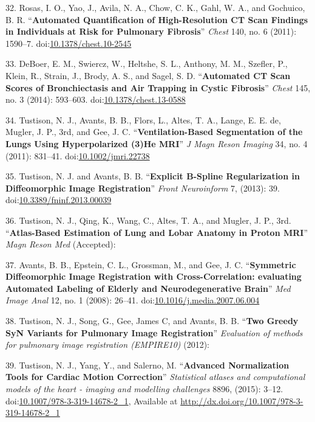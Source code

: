 \documentclass[11pt,]{article}
\begin{document}
32. Rosas, I. O., Yao, J., Avila, N. A., Chow, C. K., Gahl, W. A., and
Gochuico, B. R. ``\textbf{Automated Quantification of High-Resolution CT
Scan Findings in Individuals at Risk for Pulmonary Fibrosis}''
\emph{Chest} 140, no. 6 (2011): 1590--7.
doi:\href{http://dx.doi.org/10.1378/chest.10-2545}{10.1378/chest.10-2545}

33. DeBoer, E. M., Swiercz, W., Heltshe, S. L., Anthony, M. M., Szefler,
P., Klein, R., Strain, J., Brody, A. S., and Sagel, S. D.
``\textbf{Automated CT Scan Scores of Bronchiectasis and Air Trapping in
Cystic Fibrosis}'' \emph{Chest} 145, no. 3 (2014): 593--603.
doi:\href{http://dx.doi.org/10.1378/chest.13-0588}{10.1378/chest.13-0588}

34. Tustison, N. J., Avants, B. B., Flors, L., Altes, T. A., Lange, E.
E. de, Mugler, J. P., 3rd, and Gee, J. C. ``\textbf{Ventilation-Based
Segmentation of the Lungs Using Hyperpolarized (3)He MRI}'' \emph{J Magn
Reson Imaging} 34, no. 4 (2011): 831--41.
doi:\href{http://dx.doi.org/10.1002/jmri.22738}{10.1002/jmri.22738}

35. Tustison, N. J. and Avants, B. B. ``\textbf{Explicit B-Spline
Regularization in Diffeomorphic Image Registration}'' \emph{Front
Neuroinform} 7, (2013): 39.
doi:\href{http://dx.doi.org/10.3389/fninf.2013.00039}{10.3389/fninf.2013.00039}

36. Tustison, N. J., Qing, K., Wang, C., Altes, T. A., and Mugler, J.
P., 3rd. ``\textbf{Atlas-Based Estimation of Lung and Lobar Anatomy in
Proton MRI}'' \emph{Magn Reson Med} (Accepted):

37. Avants, B. B., Epstein, C. L., Grossman, M., and Gee, J. C.
``\textbf{Symmetric Diffeomorphic Image Registration with
Cross-Correlation: evaluating Automated Labeling of Elderly and
Neurodegenerative Brain}'' \emph{Med Image Anal} 12, no. 1 (2008):
26--41.
doi:\href{http://dx.doi.org/10.1016/j.media.2007.06.004}{10.1016/j.media.2007.06.004}

38. Tustison, N. J., Song, G., Gee, James C, and Avants, B. B.
``\textbf{Two Greedy SyN Variants for Pulmonary Image Registration}''
\emph{Evaluation of methods for pulmonary image registration (EMPIRE10)}
(2012):

39. Tustison, N. J., Yang, Y., and Salerno, M. ``\textbf{Advanced
Normalization Tools for Cardiac Motion Correction}'' \emph{Statistical
atlases and computational models of the heart - imaging and modelling
challenges} 8896, (2015): 3--12.
doi:\href{http://dx.doi.org/10.1007/978-3-319-14678-2_1}{10.1007/978-3-319-14678-2\_1},
Available at \url{http://dx.doi.org/10.1007/978-3-319-14678-2_1}
\end{document}
